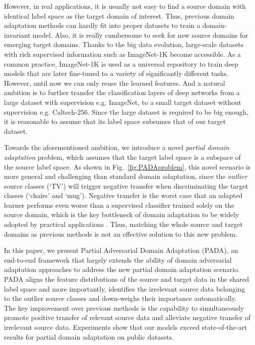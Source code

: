 \documentclass[runningheads]{llncs}
\begin{document}
However, in real applications, it is usually not easy to find a source domain with identical label space as the target domain of interest. Thus, previous domain adaptation methods can hardly fit into proper datasets to train a domain-invariant model. Also, it is really cumbersome to seek for new source domains for emerging target domains. 
Thanks to the big data evolution, large-scale datasets with rich supervised information such as ImageNet-1K become accessible. As a common practice, ImageNet-1K is used as a universal repository to train deep models that are later fine-tuned to a variety of significantly different tasks. However, until now we can only reuse the learned features.
And a natural ambition is to further transfer the classification layers of deep networks from a large dataset with supervision e.g. ImageNet, to a small target dataset without supervision e.g. Caltech-256. Since the large dataset is required to be big enough, it is reasonable to assume that its label space subsumes that of our target dataset.

Towards the aforementioned ambition, we introduce a novel \emph{partial domain adaptation} problem, which assumes that the target label space is a subspace of the source label space.  As shown in Fig.~\ref{fig:PADAproblem}, this novel scenario is more general and challenging than standard domain adaptation, since the \emph{outlier} source classes (`TV') will trigger negative transfer when discriminating the target classes (`chairs' and `mug'). Negative transfer is the worst case that an adapted learner performs even worse than a supervised classifier trained solely on the source domain, which is the key bottleneck of domain adaptation to be widely adopted by practical applications \cite{cite:TKDE10TLSurvey}.
Thus, matching the whole source and target domains as previous methods is not an effective solution to this new problem.

In this paper, we present Partial Adversarial Domain Adaptation (PADA), an end-to-end framework that largely extends the ability of domain adversarial adaptation approaches \cite{cite:ICML15RevGrad,cite:ICCV15SDT,cite:CVPR17ADDA} to address the new partial domain adaptation scenario. PADA aligns the feature distributions of the source and target data in the shared label space and more importantly, identifies the irrelevant source data belonging to the outlier source classes and down-weighs their importance automatically. The key improvement over previous methods is the capability to simultaneously promote positive transfer of relevant source data and alleviate negative transfer of irrelevant source data. Experiments show that our models exceed state-of-the-art results for partial domain adaptation on public datasets.
\end{document}
